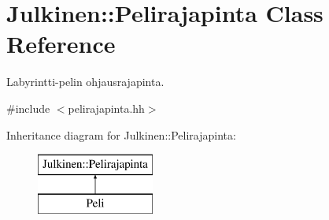 \hypertarget{class_julkinen_1_1_pelirajapinta}{}\section{Julkinen\+:\+:Pelirajapinta Class Reference}
\label{class_julkinen_1_1_pelirajapinta}


Labyrintti-\/pelin ohjausrajapinta.  




{\ttfamily \#include $<$pelirajapinta.\+hh$>$}

Inheritance diagram for Julkinen\+:\+:Pelirajapinta\+:\begin{figure}[H]
\begin{center}
\leavevmode
\includegraphics[height=2.000000cm]{class_julkinen_1_1_pelirajapinta}
\end{center}
\end{figure}
